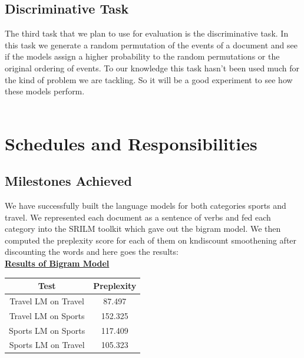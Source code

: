 \documentclass[11pt]{article}
\begin{document}
\subsection{Discriminative Task}
The third task that we plan to use for evaluation is the discriminative task. In this task we generate a random permutation of the events of a document and see if the models assign a higher probability to the random permutations or the original ordering of events.
To our knowledge this task hasn’t been used much for the kind of problem we are tackling. So it will be a good experiment to see how these models perform. \\ 
\smallskip \\

\section{Schedules and Responsibilities}
\subsection{Milestones Achieved}
We have successfully built the language models for both categories sports and travel. We represented each document as a sentence of verbs and fed each category into the SRILM toolkit which gave out the bigram model. We then computed the preplexity score for each of them on kndiscount smoothening after discounting the words and here goes the results: \\
\underline{\textbf{Results of Bigram Model}} \\
\begin{table}[H]
\begin{center}
\begin{tabular}{|c|c|}
\hline 
\bf Test & \bf  Preplexity \\ 
\hline 
Travel LM on Travel & 87.497 \\ 
\hline 
Travel LM on Sports & 152.325 \\ 
\hline 
Sports LM on Sports & 117.409 \\
\hline
Sports LM on Travel & 105.323 \\
\hline
\end{tabular} 
\end{center}
\end{table}
\end{document}
